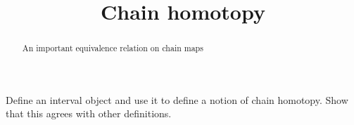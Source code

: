 \documentclass{ximera}
\title{Chain homotopy}
\begin{document}
\begin{abstract}
  An important equivalence relation on chain maps
\end{abstract}
\maketitle

Define an interval object and use it to define a notion of chain
homotopy.  Show that this agrees with other definitions.
\end{document}
